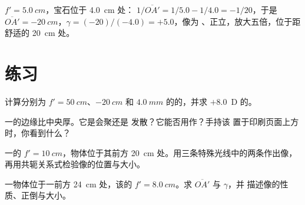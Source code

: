 \begin{example}[珠宝匠的放大镜]\label{ex:g11:lenses-and-eye:magnifier}
 $f' = \qty{5.0}{cm}$，宝石位于 \qty{4.0}{cm} 处：
$1/\overline{OA'} = 1/5.0 - 1/4.0 = -1/20$，于是
$\overline{OA'} = \qty{-20}{cm}$，$\gamma = (-20)/(-4.0) = +5.0$，像为
、正立，放大五倍，位于距舒适的
\qty{20}{cm} 处。
\end{example}

\section{练习}

\begin{exercise}[$\star$]\label{exo:g11:lenses-and-eye:1}
计算分别为 $f' = \qty{50}{cm}$、$\qty{-20}{cm}$ 和
$\qty{4.0}{mm}$ 的的，并求 $+8.0$~D 的。
\end{exercise}

\begin{exercise}[$\star$]\label{exo:g11:lenses-and-eye:2}
一的边缘比中央厚。它是会聚还是
发散？它能否用作？手持该
置于印刷页面上方时，你看到什么？
\end{exercise}

\begin{exercise}[$\star$]\label{exo:g11:lenses-and-eye:3}
一的 $f' = \qty{10}{cm}$，物体位于其前方
\qty{20}{cm} 处。用三条特殊光线中的两条作出像，
再用共轭关系式检验像的位置与大小。
\end{exercise}

\begin{exercise}[$\star$]\label{exo:g11:lenses-and-eye:4}
一物体位于一前方 \qty{24}{cm} 处，该的
$f' = \qty{8.0}{cm}$。求 $\overline{OA'}$ 与 $\gamma$，并
描述像的性质、正倒与大小。
\end{exercise}

